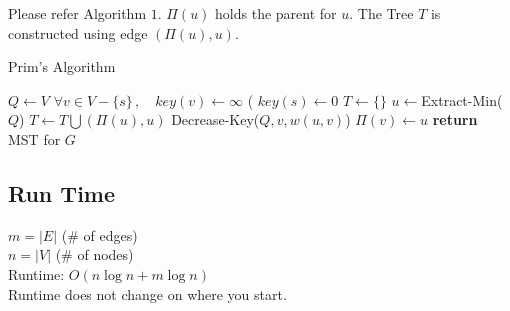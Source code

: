 \documentclass{article}
\theoremstyle{definition}
\theoremstyle{remark}
\theoremstyle{plain}
\begin{document}
Please refer Algorithm $1$.  $\Pi(u)$ holds the parent for $u$.  The Tree $T$ is constructed using edge $(\Pi(u),u)$.
\begin{algorithm}
\caption{Prim's Algorithm}\label{Prim's Algorithm to find MSt}
\begin{algorithmic}[1]
	\State $Q \gets V$
	\State $\forall v \in V - \{s\} \,,\quad key(v) \gets \infty$ (
	\State $key(s) \gets 0$ 
	\State $T \gets \{\}$
		\State $u \gets $Extract-Min($Q$) 
		\State $ T \gets T \bigcup (\Pi(u),u)$
				\State Decrease-Key($Q,v,w(u,v)$)
				\State $\Pi(v) \gets u$
			\EndIf
		\EndFor
	\EndWhile 
	\State \textbf{return} MST for $G$
	\EndProcedure
\end{algorithmic}
\end{algorithm}

\subsection{Run Time}
$m = |E|$ (\# of edges) \\
 $n = |V|$ (\# of nodes) \\
 Runtime: $O( n \log n + m \log n) $\\
 Runtime does not change on where you start.
 
 

 
 
\end{document}
